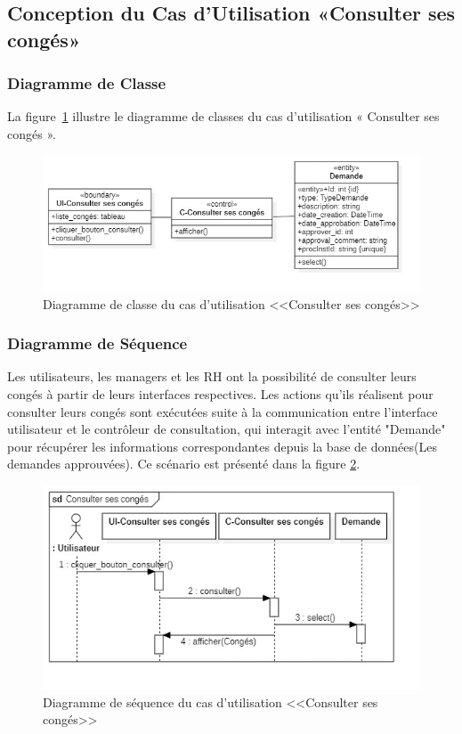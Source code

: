 \subsection{Conception du Cas d'Utilisation «Consulter ses congés»}
\subsubsection{Diagramme de Classe}
La figure~\ref{fig:Consulter_ses_conges} illustre le diagramme de classes du cas d'utilisation « Consulter ses congés ».
\begin{figure}[h]
     \centering
     \includegraphics[width=15cm]{images/C-ccon.jpg}
     \vspace{-1cm}
     \caption{Diagramme de classe du cas d'utilisation <<Consulter ses congés>>}
     \label{fig:Consulter_ses_conges}
\end{figure}

\subsubsection{Diagramme de Séquence}
Les utilisateurs, les managers et les RH ont la possibilité de consulter leurs congés à partir de leurs interfaces respectives. Les actions qu'ils réalisent pour consulter leurs congés sont exécutées suite à la communication entre l'interface utilisateur et le contrôleur de consultation, qui interagit avec l'entité "Demande" pour récupérer les informations correspondantes depuis la base de données(Les demandes approuvées). Ce scénario est présenté dans la figure \ref{fig:S_Consulter_ses_conges}.
\begin{figure}[h]
     \centering
     \includegraphics[width=15cm]{images/S-ccon.jpg}
     \caption{Diagramme de séquence du cas d'utilisation <<Consulter ses congés>>}
     \label{fig:S_Consulter_ses_conges}
\end{figure}
\newpage
